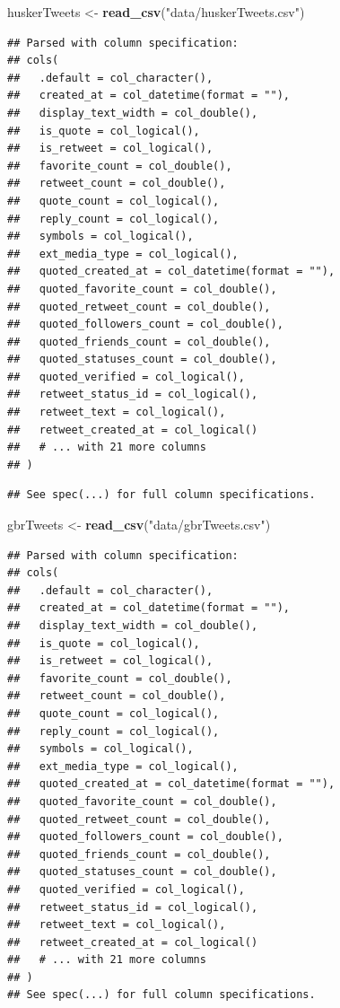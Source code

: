 \documentclass[
]{book}
\newenvironment{Shaded}{\begin{snugshade}}{\end{snugshade}}
\newcommand{\KeywordTok}[1]{\textcolor[rgb]{0.13,0.29,0.53}{\textbf{#1}}}
\newcommand{\NormalTok}[1]{#1}
\newcommand{\StringTok}[1]{\textcolor[rgb]{0.31,0.60,0.02}{#1}}
\begin{document}
\begin{Shaded}
\begin{Highlighting}[]
\NormalTok{huskerTweets <-}\StringTok{ }\KeywordTok{read_csv}\NormalTok{(}\StringTok{"data/huskerTweets.csv"}\NormalTok{)}
\end{Highlighting}
\end{Shaded}

\begin{verbatim}
## Parsed with column specification:
## cols(
##   .default = col_character(),
##   created_at = col_datetime(format = ""),
##   display_text_width = col_double(),
##   is_quote = col_logical(),
##   is_retweet = col_logical(),
##   favorite_count = col_double(),
##   retweet_count = col_double(),
##   quote_count = col_logical(),
##   reply_count = col_logical(),
##   symbols = col_logical(),
##   ext_media_type = col_logical(),
##   quoted_created_at = col_datetime(format = ""),
##   quoted_favorite_count = col_double(),
##   quoted_retweet_count = col_double(),
##   quoted_followers_count = col_double(),
##   quoted_friends_count = col_double(),
##   quoted_statuses_count = col_double(),
##   quoted_verified = col_logical(),
##   retweet_status_id = col_logical(),
##   retweet_text = col_logical(),
##   retweet_created_at = col_logical()
##   # ... with 21 more columns
## )
\end{verbatim}

\begin{verbatim}
## See spec(...) for full column specifications.
\end{verbatim}

\begin{Shaded}
\begin{Highlighting}[]
\NormalTok{gbrTweets <-}\StringTok{ }\KeywordTok{read_csv}\NormalTok{(}\StringTok{"data/gbrTweets.csv"}\NormalTok{)}
\end{Highlighting}
\end{Shaded}

\begin{verbatim}
## Parsed with column specification:
## cols(
##   .default = col_character(),
##   created_at = col_datetime(format = ""),
##   display_text_width = col_double(),
##   is_quote = col_logical(),
##   is_retweet = col_logical(),
##   favorite_count = col_double(),
##   retweet_count = col_double(),
##   quote_count = col_logical(),
##   reply_count = col_logical(),
##   symbols = col_logical(),
##   ext_media_type = col_logical(),
##   quoted_created_at = col_datetime(format = ""),
##   quoted_favorite_count = col_double(),
##   quoted_retweet_count = col_double(),
##   quoted_followers_count = col_double(),
##   quoted_friends_count = col_double(),
##   quoted_statuses_count = col_double(),
##   quoted_verified = col_logical(),
##   retweet_status_id = col_logical(),
##   retweet_text = col_logical(),
##   retweet_created_at = col_logical()
##   # ... with 21 more columns
## )
## See spec(...) for full column specifications.
\end{verbatim}
\end{document}
